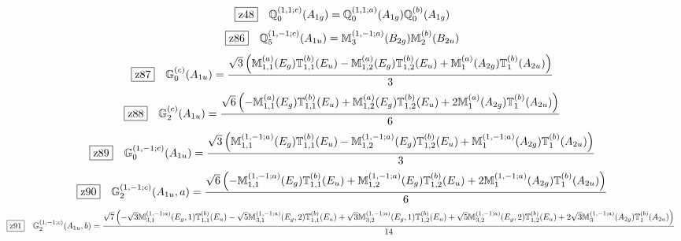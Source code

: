 \documentclass[fleqn,10pt,landscape]{jsarticle}
\begin{document}
\begin{dmath*}
\hspace*{3mm}\fbox{z48}\quad \mathbb{Q}_{0}^{(1,1;c)}(A_{1g})=\mathbb{Q}_{0}^{(1,1;a)}(A_{1g}) \mathbb{Q}_{0}^{(b)}(A_{1g})
\end{dmath*}
\begin{dmath*}
\hspace*{3mm}\fbox{z86}\quad \mathbb{Q}_{5}^{(1,-1;c)}(A_{1u})=\mathbb{M}_{3}^{(1,-1;a)}(B_{2g}) \mathbb{M}_{2}^{(b)}(B_{2u})
\end{dmath*}
\begin{dmath*}
\hspace*{3mm}\fbox{z87}\quad \mathbb{G}_{0}^{(c)}(A_{1u})=\frac{\sqrt{3} \left(\mathbb{M}_{1,1}^{(a)}(E_{g}) \mathbb{T}_{1,1}^{(b)}(E_{u}) - \mathbb{M}_{1,2}^{(a)}(E_{g}) \mathbb{T}_{1,2}^{(b)}(E_{u}) + \mathbb{M}_{1}^{(a)}(A_{2g}) \mathbb{T}_{1}^{(b)}(A_{2u})\right)}{3}
\end{dmath*}
\begin{dmath*}
\hspace*{3mm}\fbox{z88}\quad \mathbb{G}_{2}^{(c)}(A_{1u})=\frac{\sqrt{6} \left(- \mathbb{M}_{1,1}^{(a)}(E_{g}) \mathbb{T}_{1,1}^{(b)}(E_{u}) + \mathbb{M}_{1,2}^{(a)}(E_{g}) \mathbb{T}_{1,2}^{(b)}(E_{u}) + 2 \mathbb{M}_{1}^{(a)}(A_{2g}) \mathbb{T}_{1}^{(b)}(A_{2u})\right)}{6}
\end{dmath*}
\begin{dmath*}
\hspace*{3mm}\fbox{z89}\quad \mathbb{G}_{0}^{(1,-1;c)}(A_{1u})=\frac{\sqrt{3} \left(\mathbb{M}_{1,1}^{(1,-1;a)}(E_{g}) \mathbb{T}_{1,1}^{(b)}(E_{u}) - \mathbb{M}_{1,2}^{(1,-1;a)}(E_{g}) \mathbb{T}_{1,2}^{(b)}(E_{u}) + \mathbb{M}_{1}^{(1,-1;a)}(A_{2g}) \mathbb{T}_{1}^{(b)}(A_{2u})\right)}{3}
\end{dmath*}
\begin{dmath*}
\hspace*{3mm}\fbox{z90}\quad \mathbb{G}_{2}^{(1,-1;c)}(A_{1u},a)=\frac{\sqrt{6} \left(- \mathbb{M}_{1,1}^{(1,-1;a)}(E_{g}) \mathbb{T}_{1,1}^{(b)}(E_{u}) + \mathbb{M}_{1,2}^{(1,-1;a)}(E_{g}) \mathbb{T}_{1,2}^{(b)}(E_{u}) + 2 \mathbb{M}_{1}^{(1,-1;a)}(A_{2g}) \mathbb{T}_{1}^{(b)}(A_{2u})\right)}{6}
\end{dmath*}
\begin{dmath*}
\hspace*{3mm}\fbox{z91}\quad \mathbb{G}_{2}^{(1,-1;c)}(A_{1u},b)=\frac{\sqrt{7} \left(- \sqrt{3} \mathbb{M}_{3,1}^{(1,-1;a)}(E_{g},1) \mathbb{T}_{1,1}^{(b)}(E_{u}) - \sqrt{5} \mathbb{M}_{3,1}^{(1,-1;a)}(E_{g},2) \mathbb{T}_{1,1}^{(b)}(E_{u}) + \sqrt{3} \mathbb{M}_{3,2}^{(1,-1;a)}(E_{g},1) \mathbb{T}_{1,2}^{(b)}(E_{u}) + \sqrt{5} \mathbb{M}_{3,2}^{(1,-1;a)}(E_{g},2) \mathbb{T}_{1,2}^{(b)}(E_{u}) + 2 \sqrt{3} \mathbb{M}_{3}^{(1,-1;a)}(A_{2g}) \mathbb{T}_{1}^{(b)}(A_{2u})\right)}{14}
\end{dmath*}
\end{document}
